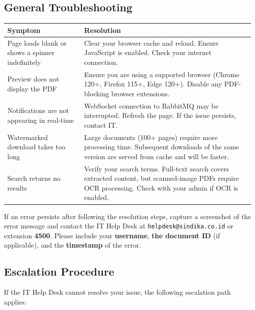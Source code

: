 \subsection{General Troubleshooting}

\begin{tabularx}{\textwidth}{@{} p{} X @{}}
  \toprule
  \textbf{Symptom} & \textbf{Resolution} \\
  \midrule
  Page loads blank or shows a spinner indefinitely
    & Clear your browser cache and reload. Ensure JavaScript
      is enabled. Check your internet connection. \\
  Preview does not display the PDF
    & Ensure you are using a supported browser (Chrome 120+,
      Firefox 115+, Edge 120+). Disable any PDF-blocking
      browser extensions. \\
  Notifications are not appearing in real-time
    & WebSocket connection to RabbitMQ may be interrupted.
      Refresh the page. If the issue persists, contact IT. \\
  Watermarked download takes too long
    & Large documents (100+ pages) require more processing
      time. Subsequent downloads of the same version are
      served from cache and will be faster. \\
  Search returns no results
    & Verify your search terms. Full-text search covers
      extracted content, but scanned-image PDFs require
      OCR processing. Check with your admin if OCR is
      enabled. \\
  \bottomrule
\end{tabularx}

\begin{ugImportant}
  If an error persists after following the resolution steps,
  capture a screenshot of the error message and contact the
  IT Help Desk at \texttt{helpdesk@sindika.co.id} or extension
  \textbf{4500}. Please include your \textbf{username},
  \textbf{the document ID} (if applicable), and the
  \textbf{timestamp} of the error.
\end{ugImportant}

\subsection{Escalation Procedure}

If the IT Help Desk cannot resolve your issue, the following
escalation path applies:


